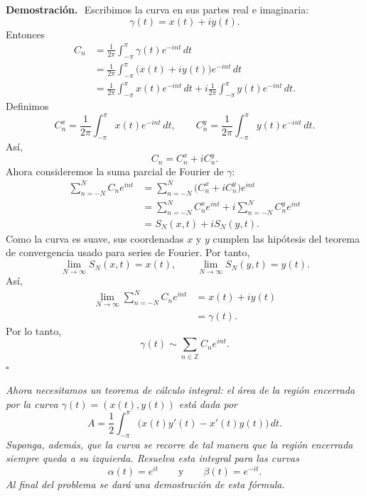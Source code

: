 \documentclass[11pt,letterpaper]{article}
\newcommand{\Z}{\mathbb{Z}}
\newcommand{\dt}{\,dt}
\begin{document}
\textbf{Demostración.}\,\
Escribimos la curva en sus partes real e imaginaria:
\begin{equation*}
    \gamma(t)=x(t)+iy(t).
\end{equation*}
Entonces
\begin{align*}
    C_n
    &=\frac{1}{2\pi}\int_{-\pi}^{\pi}\gamma(t)e^{-int}\dt \\
    &=\frac{1}{2\pi}\int_{-\pi}^{\pi}\bigl(x(t)+iy(t)\bigr)e^{-int}\dt \\
    &=\frac{1}{2\pi}\int_{-\pi}^{\pi}x(t)e^{-int}\dt
    +i\frac{1}{2\pi}\int_{-\pi}^{\pi}y(t)e^{-int}\dt.
\end{align*}
Definimos
\begin{equation*}
    C_n^x=\frac{1}{2\pi}\int_{-\pi}^{\pi}x(t)e^{-int}\dt,
    \qquad
    C_n^y=\frac{1}{2\pi}\int_{-\pi}^{\pi}y(t)e^{-int}\dt.
\end{equation*}
Así,
\begin{equation*}
    C_n=C_n^x+iC_n^y.
\end{equation*}
Ahora consideremos la suma parcial de Fourier de $\gamma$:
\begin{align*}
    \sum_{n=-N}^{N}C_ne^{int}
    &=\sum_{n=-N}^{N}\bigl(C_n^x+iC_n^y\bigr)e^{int} \\
    &=\sum_{n=-N}^{N}C_n^x e^{int}
    +i\sum_{n=-N}^{N}C_n^y e^{int} \\
    &=S_N(x,t)+iS_N(y,t).
\end{align*}
Como la curva es suave, sus coordenadas $x$ y $y$ cumplen las hipótesis del teorema de convergencia usado para series de Fourier. Por tanto,
\begin{equation*}
    \lim_{N\to\infty}S_N(x,t)=x(t),
    \qquad
    \lim_{N\to\infty}S_N(y,t)=y(t).
\end{equation*}
Así,\begin{align*}
    \lim_{N\to\infty}\sum_{n=-N}^{N}C_ne^{int}
    &=x(t)+iy(t) \\
    &=\gamma(t).
\end{align*}
Por lo tanto,
\begin{equation*}
    \gamma(t)\sim\sum_{n\in\Z}C_ne^{int}.
\end{equation*}
\hfill $\square$

\newpage

\begin{tcolorbox}[title=\textcolor{white}{Problema 13}]
\textit{Ahora necesitamos un teorema de cálculo integral: el área de la región encerrada por la curva $\gamma(t)=(x(t),y(t))$ está dada por}
\begin{equation*}
    A=\frac12\int_{-\pi}^{\pi}\bigl(x(t)y'(t)-x'(t)y(t)\bigr)\,dt.
\end{equation*}
\textit{Suponga, además, que la curva se recorre de tal manera que la región encerrada siempre queda a su izquierda. Resuelva esta integral para las curvas}
\begin{equation*}
    \alpha(t)=e^{it}
    \qquad\text{y}\qquad
    \beta(t)=e^{-it}.
\end{equation*}
\textit{Al final del problema se dará una demostración de esta fórmula.}
\end{tcolorbox}
\end{document}
